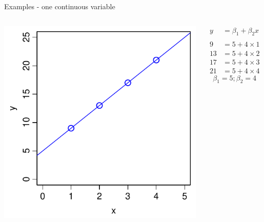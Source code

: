 \documentclass[xcolor=x11names,compress]{beamer}
\renewcommand{\(}{\begin{columns}}
\renewcommand{\)}{\end{columns}}
\newcommand{\<}[1]{\begin{column}{#1}}
\renewcommand{\>}{\end{column}}
\begin{document}
    \begin{frame}{Examples - one continuous variable}
    
    \begin{columns}[T]
    
            \includegraphics[width=\textwidth]{Intercept.pdf}
            
            \begin{align*}
              y  &= \beta_1 + \beta_2 x \\
              \\
              9  &= 5 + 4 \times 1 \\
              13 &= 5 + 4 \times 2 \\
              17 &= 5 + 4 \times 3 \\
              21 &= 5 + 4 \times 4   
            \end{align*}
            \[\beta_1 = 5; \beta_2=4\]
    \end{columns}
\end{frame}
\end{document}
